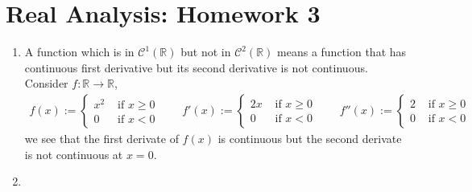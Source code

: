 \documentclass[a4paper,12pt]{article}
\theoremstyle{definition}
\begin{document}
\section*{Real Analysis: Homework 3}

\begin{enumerate}
\item
A function which is in $\mathcal{C}^1(\mathbb{R})$ but not in $\mathcal{C}^2(\mathbb{R})$ means a function that has continuous first derivative but its second derivative is not continuous. Consider $f: \mathbb{R} \to \mathbb{R}$,
\begin{align*}
f(x):=\begin{cases}
x^2 & \text{ if }x \geq 0\\
0 & \text{ if }x <0
\end{cases}\qquad
f'(x):=\begin{cases}
2x & \text{ if }x \geq 0\\
0 & \text{ if }x <0
\end{cases}\qquad
f''(x):=\begin{cases}
2 & \text{ if }x \geq 0\\
0 & \text{ if }x <0
\end{cases}
\end{align*}
we see that the first derivate of $f(x)$ is continuous but the second derivate is not continuous at $x =0$.



\item








\end{enumerate}
\end{document}
